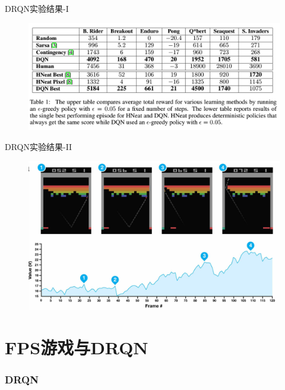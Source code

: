 \documentclass[10pt]{beamer}
\begin{document}
	\begin{frame}{DRQN}{实验结果-I}
		\begin{figure}
			\centering
			\includegraphics[width=0.7\linewidth]{pictures/drqn-expr-result-tab}
			\caption{}
			\label{fig:drqn-expr-result-tab}
		\end{figure}	
	\end{frame}

	\begin{frame}{DRQN}{实验结果-II}
		\begin{figure}
			\centering
			\includegraphics[width=0.7\linewidth]{pictures/drqn-expr-result-chart}
			\caption{}
			\label{fig:drqn-expr-result-chart}
		\end{figure}
		
	\end{frame}
	
	\part{FPS游戏与DRQN}
	
	\section{DRQN}
	
\end{document}
